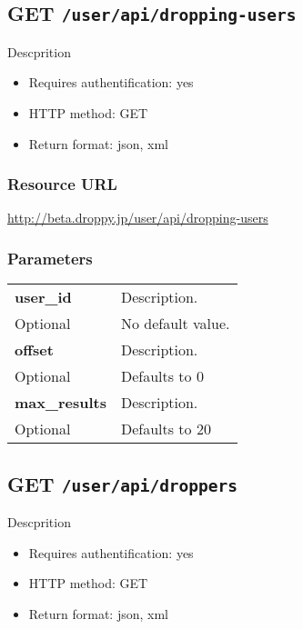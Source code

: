 \documentclass[11pt,a4paper]{article}
\newcommand{\content}[1]{\begin{minipage}{10cm}\vspace{2mm}#1\vspace{2mm}\end{minipage}}
\begin{document}
      \newpage
      
      
  \subsection*{GET {\tt /user/api/dropping-users}}
  Descprition
  \begin{itemize}
  \item Requires authentification: yes
  \item HTTP method: GET
  \item Return format: json, xml
  \end{itemize}
  \subsubsection*{Resource URL}
  \url{http://beta.droppy.jp/user/api/dropping-users}
  \subsubsection*{Parameters}
  \begin{table}[h]
    \begin{center}
      \begin{tabular}{l l}
        \hline 
      \textbf{user\_id} & \content{Description. }
      \\
      Optional & No default value.\\
      \hline
      \textbf{offset} & \content{Description. }
      \\
      Optional & Defaults to 0\\
      \hline
      \textbf{max\_results} & \content{Description. }
      \\
      Optional & Defaults to 20\\
      \hline
      \end{tabular}
    \end{center}
  \end{table}
  
      \newpage
      
      
  \subsection*{GET {\tt /user/api/droppers}}
  Descprition
  \begin{itemize}
  \item Requires authentification: yes
  \item HTTP method: GET
  \item Return format: json, xml
  \end{itemize}
\end{document}

